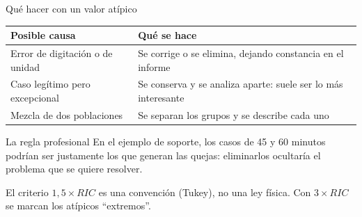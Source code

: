 \documentclass[aspectratio=169,10pt]{beamer}
\begin{document}
\begin{frame}{Qué hacer con un valor atípico}
  \scriptsize
  \begin{center}
  \begin{tabular}{@{}p{4.2cm}p{7.6cm}@{}}
    \toprule
    \textbf{Posible causa} & \textbf{Qué se hace} \\
    \midrule
    Error de digitación o de unidad &
      Se corrige o se elimina, dejando constancia en el informe \\
    \addlinespace
    Caso legítimo pero excepcional &
      Se conserva y se analiza aparte: suele ser lo más interesante \\
    \addlinespace
    Mezcla de dos poblaciones &
      Se separan los grupos y se describe cada uno \\
    \bottomrule
  \end{tabular}
  \end{center}

  \vspace{0.15cm}
  \begin{alertblock}{La regla profesional}
    \scriptsize
     En el ejemplo de
    soporte, los casos de 45 y 60 minutos podrían ser justamente los que
    generan las quejas: eliminarlos ocultaría el problema que se quiere
    resolver.
  \end{alertblock}

  \vspace{0.1cm}
  {\tiny\color{uniGris} El criterio $1{,}5 \times RIC$ es una convención (Tukey),
  no una ley física. Con $3 \times RIC$ se marcan los atípicos ``extremos''.}
\end{frame}
\end{document}
